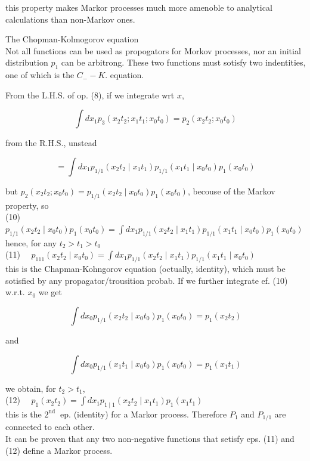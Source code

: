 \documentclass[10pt]{article}
\begin{document}
this property makes Markor processes much more amenoble to analytical calculations than non-Markov ones.

The Chopman-Kolmogorov equation\\
Not all functions can be used as propogators for Morkov processes, nor an initial distribution $p_{1}$ can be arbitrong. These two functions must sotisfy two indentities, one of which is the $C_{-}-K$. equation.

From the L.H.S. of op. (8), if we integrate wrt $x$,

$$
\int d x_{1} p_{3}\left(x_{2} t_{2} ; x_{1} t_{1} ; x_{0} t_{0}\right)=p_{2}\left(x_{2} t_{2} ; x_{0} t_{0}\right)
$$

from the R.H.S., unstead

$$
=\int d x_{1} p_{1 / 1}\left(x_{2} t_{2} \mid x_{1} t_{1}\right) p_{1 / 1}\left(x_{1} t_{1} \mid x_{0} t_{0}\right) p_{1}\left(x_{0} t_{0}\right)
$$

but $p_{2}\left(x_{2} t_{2} ; x_{0} t_{0}\right)=p_{1 / 1}\left(x_{2} t_{2} \mid x_{0} t_{0}\right) p_{1}\left(x_{0} t_{0}\right)$, becouse of the Markov property, so\\
(10)\\
$p_{1 / 1}\left(x_{2} t_{2} \mid x_{0} t_{0}\right) p_{1}\left(x_{0} t_{0}\right)=\int d x_{1} p_{1 / 1}\left(x_{2} t_{2} \mid x_{1} t_{1}\right) p_{1 / 1}\left(x_{1} t_{1} \mid x_{0} t_{0}\right) p_{1}\left(x_{0} t_{0}\right)$\\
hence, for any $t_{2}>t_{1}>t_{0}$\\
(11) $\quad p_{111}\left(x_{2} t_{2} \mid x_{0} t_{0}\right)=\int d x_{1} p_{1 / 1}\left(x_{2} t_{2} \mid x_{1} t_{1}\right) p_{1 / 1}\left(x_{1} t_{1} \mid x_{0} t_{0}\right)$\\
this is the Chapman-Kohngorov equation (octually, identity), which must be sotisfied by any propagator/trousition probab. If we further integrate ef. (10) w.r.t. $x_{0}$ we get

$$
\int d x_{0} p_{1 / 1}\left(x_{2} t_{2} \mid x_{0} t_{0}\right) p_{1}\left(x_{0} t_{0}\right)=p_{1}\left(x_{2} t_{2}\right)
$$

and

$$
\int d x_{0} p_{1 / 1}\left(x_{1} t_{1} \mid x_{0} t_{0}\right) p_{1}\left(x_{0} t_{0}\right)=p_{1}\left(x_{1} t_{1}\right)
$$

we obtain, for $t_{2}>t_{1}$,\\
(12) $\quad p_{1}\left(x_{2} t_{2}\right)=\int d x_{1} p_{1 \mid 1}\left(x_{2} t_{2} \mid x_{1} t_{1}\right) p_{1}\left(x_{1} t_{1}\right)$\\
this is the $2^{\text {nd }}$ ep. (identity) for a Markor process. Therefore $P_{1}$ and $P_{1 / 1}$ are connected to each other.\\
It can be proven that any two non-negative functions that setisfy eps. (11) and (12) define a Markor process.
\end{document}
